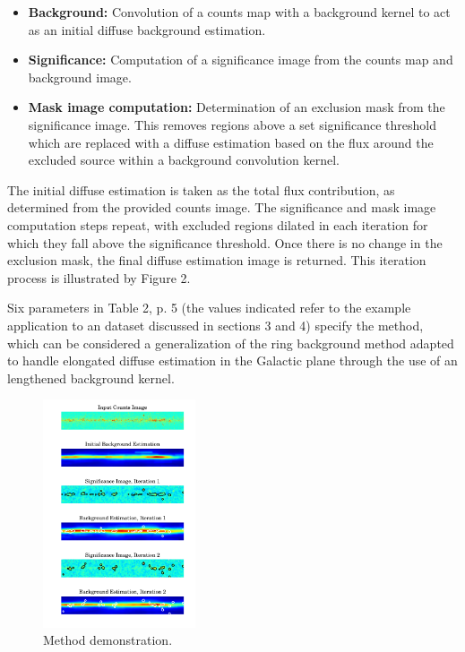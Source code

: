 \documentclass{PoS}
\begin{document}
\begin{itemize}[noitemsep,nolistsep]
\item \textbf{Background:} Convolution of a counts map with a background kernel to act as an initial diffuse background estimation.
\item \textbf{Significance:} Computation of a significance image from the counts map and background image.
\item \textbf{Mask image computation:} Determination of an exclusion mask from the significance image. This removes regions above a set significance threshold which are replaced with a diffuse estimation based on the flux around the excluded source within a background convolution kernel.
\end{itemize}

The initial diffuse estimation is taken as the total flux contribution, as determined from the provided counts image. The significance and mask image computation steps repeat, with excluded regions dilated in each iteration for which they fall above the significance threshold. Once there is no change in the exclusion mask, the final diffuse estimation image is returned. This iteration process is illustrated by Figure 2.

Six parameters in Table 2, p. 5 (the values indicated refer to the example application to an dataset discussed in sections 3 and 4) specify the method, which can be considered a generalization of the ring background method \cite{berge} adapted to handle elongated diffuse estimation in the Galactic plane through the use of an lengthened background kernel.

\begin{figure}
\vspace{-10pt}
      \includegraphics[width=0.4\textwidth]{figures/iterations.pdf}
  \caption{Method demonstration.}
\vspace{-30pt}
\end{figure}
\end{document}
